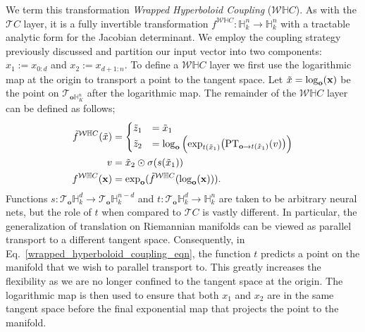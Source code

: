 We term this transformation {\em Wrapped Hyperboloid Coupling} ($\mathcal{W}\mathbb{H}C$). %
As with the $\mathcal{T}C$ layer, it is a fully invertible transformation $f^{\mathcal{W}\mathbb{H}C}: \mathbb{H}^n_k \to \mathbb{H}^n_k$ with a tractable analytic form for the Jacobian determinant. 
We employ the coupling strategy previously discussed and partition our input vector into two components: $x_1:=x_{0:d}$ and $x_2:=x_{d+1:n}$.
To define a $\mathcal{W}\mathbb{H}C$ layer we first use the logarithmic map at the origin to transport a point to the tangent space. Let $\tilde{x} = \log_{\textbf{o}}(\mathbf{x})$ be the point on $\mathcal{T}_{\textbf{o}\mathbb{H}^n_K}$ after the logarithmic map. 
The remainder of the $\mathcal{W}\mathbb{H}C$ layer can be defined as follows;
\begin{align}
\label{wrapped_hyperboloid_coupling_eqn}
\tilde{f}^{\mathcal{W}\mathbb{H}C}(\tilde{x})&=
     \begin{cases}
     \tilde{z}_{1} &= \tilde{x}_{1}  \\
     \tilde{z}_{2} &= \log_{\textbf{o}}\Big( \textnormal{exp}_{t(\tilde{x}_{1})}\big(\textnormal{PT}_{\textbf{o}\to t(\tilde{x}_{1}) }(v)\big)\Big) \nonumber
    \end{cases}\\
    v &= \tilde{x}_{2} \odot \sigma(s(\tilde{x}_{1})) \nonumber \\
    f^{\mathcal{W}\mathbb{H}C}(\mathbf{x}) &=  \textnormal{exp}_{\textbf{o}}(\tilde{f}^{\mathcal{W}\mathbb{H}C}(\log_{\textbf{o}}(\mathbf{x}))).
\end{align}
Functions $s: \mathcal{T}_{\textbf{o}}\mathbb{H}^{d}_k \to \mathcal{T}_{\textbf{o}}\mathbb{H}^{n-d}_k$ and $t:\mathcal{T}_{\textbf{o}}\mathbb{H}^{d}_k \to \mathbb{H}^n_k$ are taken to be arbitrary neural nets, but the role of $t$ when compared to $\mathcal{T}C$ is vastly different. In particular, the generalization of translation on Riemannian manifolds can be viewed as parallel transport to a different tangent space. Consequently, in Eq.~\ref{wrapped_hyperboloid_coupling_eqn}, the function $t$ predicts a point on the manifold that we wish to parallel transport to.
This greatly increases the flexibility as we are no longer confined to the tangent space at the origin. The logarithmic map is then used to ensure that both $x_1$ and $x_2$ are in the same tangent space before the final exponential map that projects the point to the manifold.

